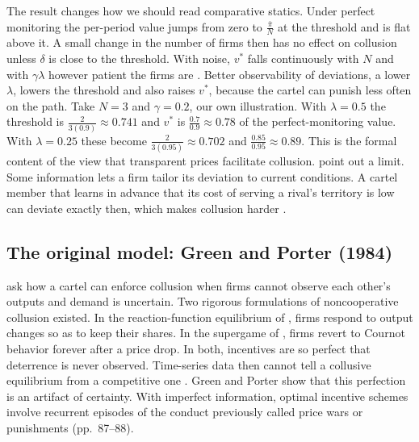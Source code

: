 The result changes how we should read comparative statics. Under perfect monitoring the per-period value jumps from
zero to $\frac{\bar\pi}{N}$ at the threshold and is flat above it. A small change in the number of firms then has no
effect on collusion unless $\delta$ is close to the threshold. With noise, $v^*$ falls continuously with $N$ and with
$\gamma\lambda$ however patient the firms are \citep[p.~205]{AskerNocke2021}. Better observability of deviations, a
lower $\lambda$, lowers the threshold and also raises $v^*$, because the cartel can punish less often on the path.
Take $N = 3$ and $\gamma = 0.2$, our own illustration. With $\lambda = 0.5$ the threshold is
$\frac{2}{3(0.9)} \approx 0.741$ and $v^*$ is $\frac{0.7}{0.9} \approx 0.78$ of the perfect-monitoring value. With
$\lambda = 0.25$ these become $\frac{2}{3(0.95)} \approx 0.702$ and $\frac{0.85}{0.95} \approx 0.89$. This is the
formal content of the view that transparent prices facilitate collusion. \citet{SugayaWolitzky2018} point out a
limit. Some information lets a firm tailor its deviation to current conditions. A cartel member that learns in advance
that its cost of serving a rival's territory is low can deviate exactly then, which makes collusion harder
\citep[p.~205, note~69]{AskerNocke2021}.

\subsection{The original model: Green and Porter (1984)}\label{sec:12-gp-original}

\citet{GreenPorter1984} ask how a cartel can enforce collusion when firms cannot observe each other's outputs and
demand is uncertain. Two rigorous formulations of noncooperative collusion existed. In the reaction-function
equilibrium of \citet{Osborne1976}, firms respond to output changes so as to keep their shares. In the supergame of
\citet{Friedman1971}, firms revert to Cournot behavior forever after a price drop. In both, incentives are so perfect
that deterrence is never observed. Time-series data then cannot tell a collusive equilibrium from a competitive one
\citep{Bresnahan1982}. Green and Porter show that this perfection is an artifact of certainty. With imperfect
information, optimal incentive schemes involve recurrent episodes of the conduct previously called price wars or
punishments (pp.~87--88).

